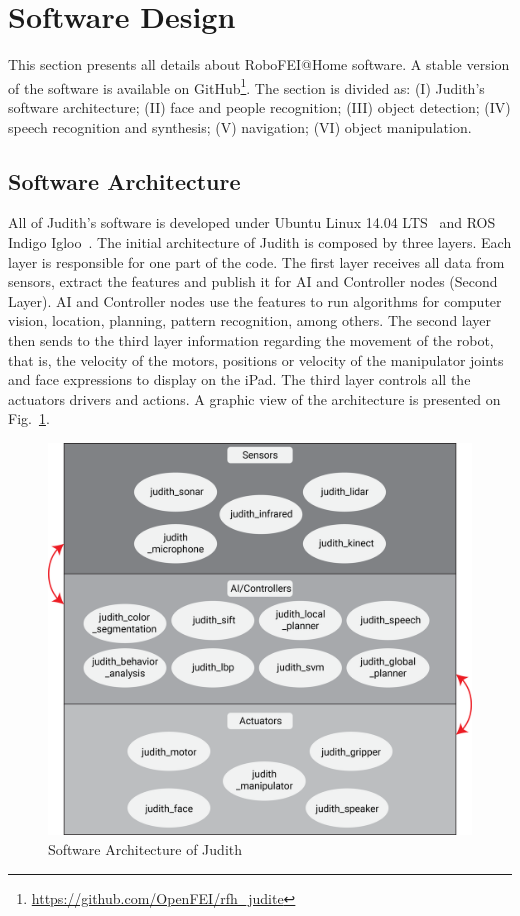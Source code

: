 \section{Software Design}

This section presents all details about RoboFEI@Home software. A stable version of the software is available on GitHub\footnote{\url{https://github.com/OpenFEI/rfh_judite}}. The section is divided as: (I) Judith's software architecture; (II) face and people recognition; (III) object detection; (IV) speech recognition and synthesis; (V) navigation; (VI) object manipulation.

\subsection{Software Architecture}\label{architecture}
All of Judith's software is developed under Ubuntu Linux 14.04 LTS~\cite{sobell:2014} and ROS Indigo Igloo~\cite{ros:2015}. The initial architecture of Judith is composed by three layers. Each layer is responsible for one part of the code. The first layer receives all data from sensors, extract the features and publish it for AI and Controller nodes (Second Layer). AI and Controller nodes use the features to run algorithms for computer vision, location, planning, pattern recognition, among others. The second layer then sends to the third layer information regarding the movement of the robot, that is, the velocity of the motors, positions or velocity of the manipulator joints and face expressions to display on the iPad. The third layer controls all the actuators drivers and actions. A graphic view of the architecture is presented on Fig.~\ref{fig:architecture}.

\begin{figure}[ht!]
    \centering
    \includegraphics[width = \textwidth]{figures/architecture.png}
    \caption{Software Architecture of Judith}
    \label{fig:architecture}
\end{figure}

